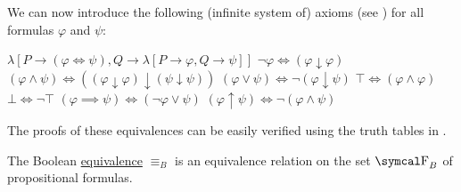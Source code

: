 \begin{remark}
  We can now introduce the following (infinite system of) axioms (see ) for all formulas \( \varphi \) and \( \psi \):
  \begin{description}
     \( \lambda[P \to (\varphi \iff \psi), Q \to \lambda[P \to \varphi, Q \to \psi]] \)
     \( \neg \varphi \iff (\varphi \downarrow \varphi) \)
     \( (\varphi \wedge \psi) \iff ((\varphi \downarrow \varphi) \downarrow (\psi \downarrow \psi)) \)
     \( (\varphi \vee \psi) \iff \neg (\varphi \downarrow \psi) \)
     \( \top \iff (\varphi \wedge \varphi) \)
     \( \bot \iff \neg \top \)
     \( (\varphi \implies \psi) \iff (\neg \varphi \vee \psi) \)
     \( (\varphi \uparrow \psi) \iff \neg (\varphi \wedge \psi) \)
  \end{description}

  The proofs of these equivalences can be easily verified using the truth tables in .
\end{remark}

\begin{proposition}\label{thm:boolean_equivalence_relation}
  The Boolean \hyperref[def:propositional_interpretation]{equivalence} \( \equiv_B \) is an equivalence relation on the set \( \CF_B \) of propositional formulas.
\end{proposition}

